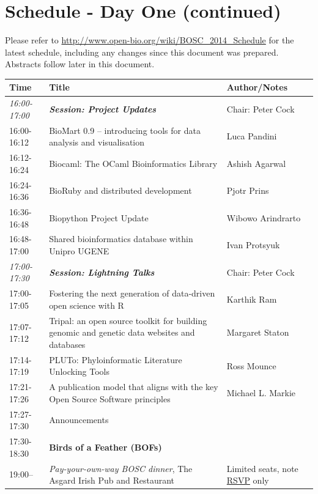 \documentclass[12pt,oneside]{article}
\begin{document}
\clearpage
\section*{Schedule - Day One (continued)}

Please refer to \url{http://www.open-bio.org/wiki/BOSC_2014_Schedule} for the
latest schedule, including any changes since this document was prepared.
Abstracts follow later in this document.

\begin{center}
\begin{tabular}{|p{2.35cm}|p{10.15cm}|p{4.1cm}|}
\hline
Time & Title & Author/Notes \\
\hline
\textit{16:00-17:00} & \textbf{\textit{Session: Project Updates}} & Chair: Peter Cock\\
16:00-16:12 & BioMart 0.9 -- introducing tools for data analysis and visualisation & Luca Pandini\\
16:12-16:24 & Biocaml: The OCaml Bioinformatics Library & Ashish Agarwal\\
16:24-16:36 & BioRuby and distributed development & Pjotr Prins\\
16:36-16:48 & Biopython Project Update & Wibowo Arindrarto\\
16:48-17:00 & Shared bioinformatics database within Unipro UGENE & Ivan Protsyuk\\
\hline
\textit{17:00-17:30} & \textbf{\textit{Session: Lightning Talks}} & Chair: Peter Cock\\
17:00-17:05 & Fostering the next generation of data-driven open science with R & Karthik Ram\\
17:07-17:12 & Tripal: an open source toolkit for building genomic and genetic data websites and databases & Margaret Staton\\
17:14-17:19 & PLUTo: Phyloinformatic Literature Unlocking Tools & Ross Mounce\\
17:21-17:26 & A publication model that aligns with the key Open Source Software principles & Michael L. Markie\\
17:27-17:30 & Announcements & \\
\hline
17:30-18:30 & \textbf{Birds of a Feather (BOFs)} & \\
\hline
19:00-- & \textit{Pay-your-own-way BOSC dinner}, The Asgard Irish Pub and Restaurant & Limited seats, note \href{http://bit.ly/BOSC2014-dinner}{RSVP} only \\
\hline
\end{tabular}
\end{center}
\end{document}
